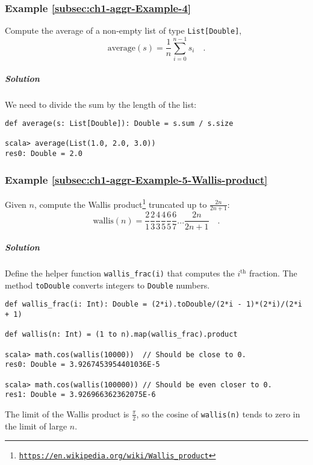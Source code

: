 \subsubsection{Example \label{subsec:ch1-aggr-Example-4}\ref{subsec:ch1-aggr-Example-4}}

Compute the average of a non-empty list of type \lstinline!List[Double]!,
\[
\text{average}\left(s\right)=\frac{1}{n}\sum_{i=0}^{n-1}s_{i}\quad.
\]


\subparagraph{Solution}

We need to divide the sum by the length of the list:
\begin{lstlisting}
def average(s: List[Double]): Double = s.sum / s.size

scala> average(List(1.0, 2.0, 3.0))
res0: Double = 2.0
\end{lstlisting}


\subsubsection{Example \label{subsec:ch1-aggr-Example-5-Wallis-product}\ref{subsec:ch1-aggr-Example-5-Wallis-product}}

Given $n$, compute the Wallis product\footnote{\texttt{\href{https://en.wikipedia.org/wiki/Wallis_product}{https://en.wikipedia.org/wiki/Wallis\_product}}}
truncated up to $\frac{2n}{2n+1}$: 
\[
\text{wallis}\left(n\right)=\frac{2}{1}\frac{2}{3}\frac{4}{3}\frac{4}{5}\frac{6}{5}\frac{6}{7}...\frac{2n}{2n+1}\quad.
\]


\subparagraph{Solution}

Define the helper function \lstinline!wallis_frac(i)! that computes
the $i^{\text{th}}$ fraction. The method \texttt{}\lstinline!toDouble!
converts integers to \texttt{}\lstinline!Double! numbers.
\begin{lstlisting}
def wallis_frac(i: Int): Double = (2*i).toDouble/(2*i - 1)*(2*i)/(2*i + 1)

def wallis(n: Int) = (1 to n).map(wallis_frac).product

scala> math.cos(wallis(10000))  // Should be close to 0.
res0: Double = 3.9267453954401036E-5

scala> math.cos(wallis(100000)) // Should be even closer to 0.
res1: Double = 3.926966362362075E-6
\end{lstlisting}
The limit of the Wallis product is $\frac{\pi}{2}$, so the cosine
of \lstinline!wallis(n)! tends to zero in the limit of large $n$.

